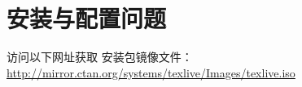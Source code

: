 %
%
%
%


\section{安装与配置问题}
\label{sec:install}





%



访问以下网址获取 \TeXLive{} 安装包镜像文件：
\url{http://mirror.ctan.org/systems/texlive/Images/texlive.iso}


